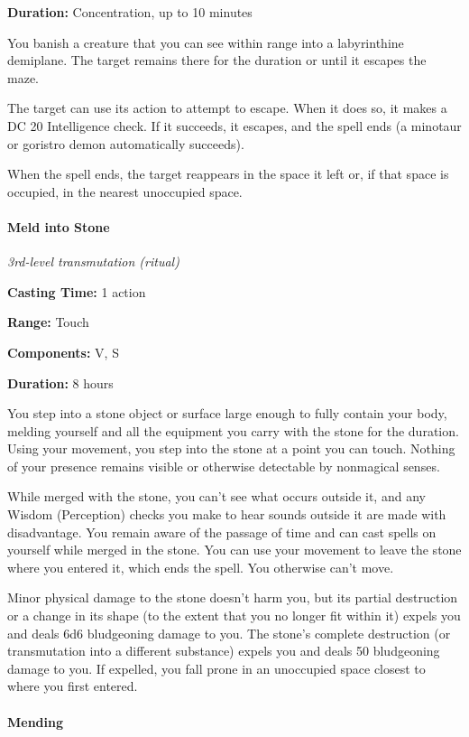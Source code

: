 \documentclass[
]{article}
\begin{document}
\textbf{Duration:} Concentration, up to 10 minutes

You banish a creature that you can see within range into a labyrinthine
demiplane. The target remains there for the duration or until it escapes
the maze.

The target can use its action to attempt to escape. When it does so, it
makes a DC 20 Intelligence check. If it succeeds, it escapes, and the
spell ends (a minotaur or goristro demon automatically succeeds).

When the spell ends, the target reappears in the space it left or, if
that space is occupied, in the nearest unoccupied space.

\hypertarget{meld-into-stone}{%
\paragraph{Meld into Stone}\label{meld-into-stone}}

\emph{3rd-level transmutation (ritual)}

\textbf{Casting Time:} 1 action

\textbf{Range:} Touch

\textbf{Components:} V, S

\textbf{Duration:} 8 hours

You step into a stone object or surface large enough to fully contain
your body, melding yourself and all the equipment you carry with the
stone for the duration. Using your movement, you step into the stone at
a point you can touch. Nothing of your presence remains visible or
otherwise detectable by nonmagical senses.

While merged with the stone, you can't see what occurs outside it, and
any Wisdom (Perception) checks you make to hear sounds outside it are
made with disadvantage. You remain aware of the passage of time and can
cast spells on yourself while merged in the stone. You can use your
movement to leave the stone where you entered it, which ends the spell.
You otherwise can't move.

Minor physical damage to the stone doesn't harm you, but its partial
destruction or a change in its shape (to the extent that you no longer
fit within it) expels you and deals 6d6 bludgeoning damage to you. The
stone's complete destruction (or transmutation into a different
substance) expels you and deals 50 bludgeoning damage to you. If
expelled, you fall prone in an unoccupied space closest to where you
first entered.

\hypertarget{mending}{%
\paragraph{Mending}\label{mending}}
\end{document}
